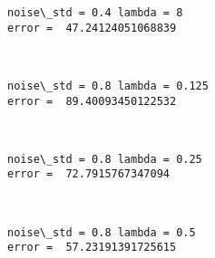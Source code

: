 \documentclass[11pt]{article}
\begin{document}
    \begin{Verbatim}[commandchars=\\\{\}]
noise\_std = 0.4 lambda = 8
error =  47.24124051068839

    \end{Verbatim}

    \begin{center}
    \end{center}
    { \hspace*{\fill} \\}
    
    \begin{Verbatim}[commandchars=\\\{\}]
noise\_std = 0.8 lambda = 0.125
error =  89.40093450122532

    \end{Verbatim}

    \begin{center}
    \end{center}
    { \hspace*{\fill} \\}
    
    \begin{Verbatim}[commandchars=\\\{\}]
noise\_std = 0.8 lambda = 0.25
error =  72.7915767347094

    \end{Verbatim}

    \begin{center}
    \end{center}
    { \hspace*{\fill} \\}
    
    \begin{Verbatim}[commandchars=\\\{\}]
noise\_std = 0.8 lambda = 0.5
error =  57.23191391725615

    \end{Verbatim}

    \begin{center}
    \end{center}
    { \hspace*{\fill} \\}
    
\end{document}
